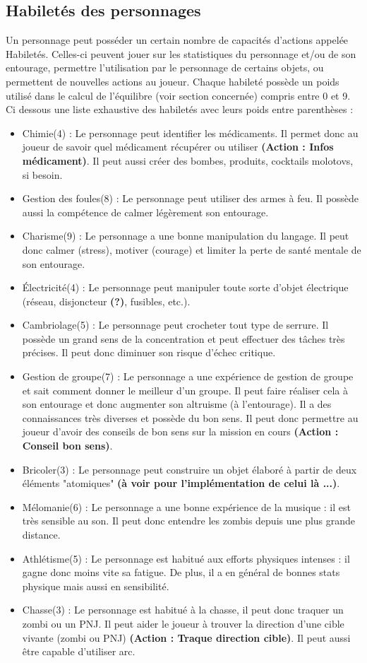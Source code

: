 \subsection{Habiletés des personnages}
Un personnage peut posséder un certain nombre de capacités d'actions appelée Habiletés. Celles-ci peuvent jouer sur les statistiques du personnage et/ou de son entourage, permettre l'utilisation par le personnage de certains objets, ou permettent de nouvelles actions au joueur. Chaque habileté possède un poids utilisé dans le calcul de l'équilibre (voir section concernée) compris entre 0 et 9. Ci dessous une liste exhaustive des habiletés avec leurs poids entre parenthèses :
\begin{itemize}
  \item Chimie(4) : Le personnage peut identifier les médicaments. Il permet donc au joueur de savoir quel médicament récupérer ou utiliser \textbf{(Action : Infos médicament)}. Il peut aussi créer des bombes, produits, cocktails molotovs, si besoin.
  \item Gestion des foules(8) : Le personnage peut utiliser des armes à feu. Il possède aussi la compétence de calmer légèrement son entourage.
  \item Charisme(9) : Le personnage a une bonne manipulation du langage. Il peut donc calmer (stress), motiver (courage) et limiter la perte de santé mentale de son entourage.
  \item Électricité(4) : Le personnage peut manipuler toute sorte d'objet électrique (réseau, disjoncteur \textbf{(?)}, fusibles, etc.).
  \item Cambriolage(5) : Le personnage peut crocheter tout type de serrure. Il possède un grand sens de la concentration et peut effectuer des tâches très précises. Il peut donc diminuer son risque d'échec critique.
  \item Gestion de groupe(7) : Le personnage a une expérience de gestion de groupe et sait comment donner le meilleur d'un groupe. Il peut faire réaliser cela à son entourage et donc augmenter son altruisme (à l'entourage). Il a des connaissances très diverses et possède du bon sens. Il peut donc permettre au joueur d'avoir des conseils de bon sens sur la mission en cours \textbf{(Action : Conseil bon sens)}.
  \item Bricoler(3) : Le personnage peut construire un objet élaboré à partir de deux éléments "atomiques" \textbf{(à voir pour l'implémentation de celui là ...)}.
  \item Mélomanie(6) : Le personnage a une bonne expérience de la musique : il est très sensible au son. Il peut donc entendre les zombis depuis une plus grande distance.
  \item Athlétisme(5) : Le personnage est habitué aux efforts physiques intenses : il gagne donc moins vite sa fatigue. De plus, il a en général de bonnes stats physique mais aussi en sensibilité.
  \item Chasse(3) : Le personnage est habitué à la chasse, il peut donc traquer un zombi ou un PNJ. Il peut  aider le joueur à trouver la direction d'une cible vivante (zombi ou PNJ) \textbf{(Action : Traque direction cible)}. Il peut aussi être capable d'utiliser arc.
\end{itemize}
